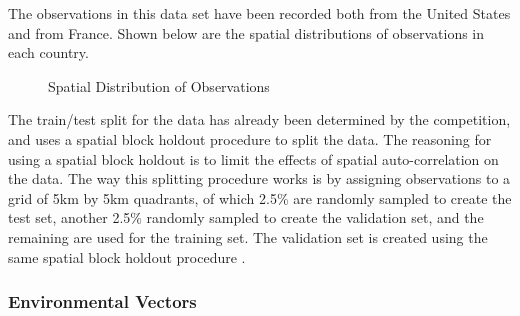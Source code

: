 \documentclass[12pt, oneside]{article}
\begin{document}
\begin{normalsize}
The observations in this data set have been recorded both from the United States and from France. Shown below are the spatial distributions of observations in each country.

\begin{figure}[H]%
    \centering
    \qquad
    \caption{Spatial Distribution of Observations}%
    \label{fig:Spatial Distribution}%
\end{figure}


The train/test split for the data has already been determined by the competition, and uses a spatial block holdout procedure to split the data. The reasoning for using a spatial block holdout is to limit the effects of spatial auto-correlation on the data. The way this splitting procedure works is by assigning observations to a grid of 5km by 5km quadrants, of which 2.5\% are randomly sampled to create the test set, another 2.5\% randomly sampled to create the validation set, and the remaining are used for the training set. The validation set is created using the same spatial block holdout procedure \cite{lorieul2021overview}.

\subsubsection{Environmental Vectors}


\end{normalsize}
\end{document}

